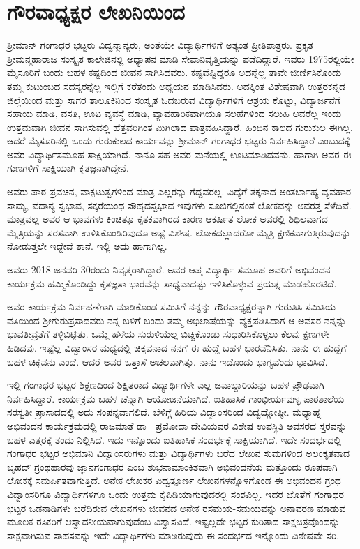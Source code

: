 \chapter{ಗೌರವಾಧ್ಯಕ್ಷರ ಲೇಖನಿಯಿಂದ}

ಶ್ರೀಮಾನ್ ಗಂಗಾಧರ ಭಟ್ಟರು ವಿದ್ವನ್ಮಾನ್ಯರು, ಅಂತೆಯೇ ವಿದ್ಯಾರ್ಥಿಗಳಿಗೆ ಅತ್ಯಂತ ಪ್ರೀತಿಪಾತ್ರರು. ಪ್ರಕೃತ ಶ್ರೀಮನ್ಮಹಾರಾಜ ಸಂಸ್ಕೃತ ಕಾಲೇಜಿನಲ್ಲಿ ಅಧ್ಯಾಪನ ಮಾಡಿ ಸೇವಾನಿವೃತ್ತಿಯನ್ನು ಪಡೆದಿದ್ದಾರೆ. ಇವರು 1975ರಲ್ಲಿಯೇ ಮೈಸೂರಿಗೆ ಬಂದು ಬಹಳ ಕಷ್ಟದಿಂದ ಜೀವನ ಸಾಗಿಸಿದವರು. ಕಷ್ಟವೆಷ್ಟಿದ್ದರೂ ಅದನ್ನೆಲ್ಲ ತಾವೇ ಜೀರ್ಣಿಸಿಕೊಂಡು ತಮ್ಮ ಕುಟುಂಬದ ಸದಸ್ಯರನ್ನೆಲ್ಲ ಇಲ್ಲಿಗೆ ಕರೆತಂದು ಅಧ್ಯಯನ ಮಾಡಿಸಿದರು. ಅದಕ್ಕಿಂತ ವಿಶೇಷವಾಗಿ ಉತ್ತರಕನ್ನಡ ಜಿಲ್ಲೆಯಿಂದ ಮತ್ತು ಸಾಗರ ತಾಲೂಕಿನಿಂದ ಸಂಸ್ಕೃತ ಓದಬರುವ ವಿದ್ಯಾರ್ಥಿಗಳಿಗೆ ಆಶ್ರಯ ಕೊಟ್ಟು, ವಿದ್ಯಾರ್ಜನೆಗೆ ಸಹಾಯ ಮಾಡಿ, ವಸತಿ, ಊಟ ವ್ಯವಸ್ಥೆ ಮಾಡಿ, ವ್ಯಾವಹಾರಿಕವಾಗಿಯೂ ಸಲಹೆಗಳಿಂದ ಸಲುಹಿ ಅವರೆಲ್ಲ ಇಂದು ಉತ್ತಮವಾಗಿ ಜೀವನ ಸಾಗಿಸುವಲ್ಲಿ ಹೆತ್ತವರಿಗಿಂತ ಮಿಗಿಲಾದ ಪಾತ್ರವಹಿಸಿದ್ದಾರೆ. ಹಿಂದಿನ ಕಾಲದ ಗುರುಕುಲ ಈಗಿಲ್ಲ. ಆದರೆ ಮೈಸೂರಿನಲ್ಲಿ ಒಂದು ಗುರುಕುಲದ ಕಾರ್ಯವನ್ನು ಶ್ರೀಮಾನ್ ಗಂಗಾಧರ ಭಟ್ಟರು ನಿರ್ವಹಿಸಿದ್ದಾರೆ ಎಂಬುದಕ್ಕೆ ಅವರ ವಿದ್ಯಾರ್ಥಿಸಮೂಹ ಸಾಕ್ಷಿಯಾಗಿದೆ. ನಾನೂ ಸಹ ಅವರ ಮನೆಯಲ್ಲಿ ಊಟಮಾಡಿದವನು. ಹಾಗಾಗಿ ಅವರ ಈ ಗುಣಗಳಿಗೆ ಸಾಕ್ಷಿಯಾಗಿ ಕೃತಜ್ಞನಾಗಿದ್ದೇನೆ.
	
ಅವರು ಪಾಠ-ಪ್ರವಚನ, ವಾಕ್ಪಟುತ್ವಗಳಿಂದ ಮಾತ್ರ ಎಲ್ಲರನ್ನು ಗೆದ್ದವರಲ್ಲ. ವಿದ್ಯೆಗೆ ತಕ್ಕನಾದ ಅಂತರ್ಬಾಹ್ಯ ವ್ಯವಹಾರ ಸಾಮ್ಯ, ವದಾನ್ಯ ಸ್ವಭಾವ, ಸಕ್ಕರೆಯಂಥ ಸೌಹೃದಸ್ವಭಾವ ಇವುಗಳು ಸೂಜಿಗಲ್ಲಿನಂತೆ ಲೋಕವನ್ನು ಅವರತ್ತ ಸೆಳೆದಿವೆ. ಮಾತ್ರವಲ್ಲ ಅವರ ಆ ಭಾವಗಳು ಕಿಂಚಿತ್ತೂ ಕೃತಕವಾಗಿರದ ಕಾರಣ ಆಕರ್ಷಿತ ಲೋಕ ಅವರಲ್ಲಿ ಶಿಥಿಲವಾಗದ ಮೈತ್ರಿಯನ್ನು ಸರಸವಾಗಿ ಉಳಿಸಿಕೊಂಡಿರಿವುದೂ ಅಷ್ಟೆ ವಿಶೇಷ. ಲೋಕದಲ್ಲಾದರೋ ಮೈತ್ರಿ ಕ್ಷಣಿಕವಾಗುತ್ತಿರುವುದನ್ನು ನೋಡುತ್ತಲೇ ಇದ್ದೇವೆ ತಾನೆ. ಇಲ್ಲಿ ಅದು ಹಾಗಾಗಿಲ್ಲ.
 
ಅವರು 2018 ಜನವರಿ 30ರಂದು ನಿವೃತ್ತರಾಗಿದ್ದಾರೆ. ಅವರ ಆಪ್ತ ವಿದ್ಯಾರ್ಥಿ ಸಮೂಹ ಅವರಿಗೆ ಅಭಿವಂದನ ಕಾರ್ಯಕ್ರಮ ಹಮ್ಮಿಕೊಂಡಿದ್ದು ಕೃತಜ್ಞತಾ ಭಾರವನ್ನು ಸಾಧ್ಯವಾದಷ್ಟು ಇಳಿಸಿಕೊಳ್ಳುವ ಪ್ರಯತ್ನ ಮಾಡಹೊರಟಿದೆ. 

ಅವರ ಕಾರ್ಯಕ್ರಮ ನಿರ್ವಹಣೆಗಾಗಿ ಮಾಡಿಕೊಂಡ ಸಮಿತಿಗೆ ನನ್ನನ್ನು ಗೌರವಾಧ್ಯಕ್ಷರನ್ನಾಗಿ ಗುರುತಿಸಿ ಸಮಿತಿಯ ವತಿಯಿಂದ ಶ್ರೀಗುರುಪ್ರಸಾದವರು ನನ್ನ ಬಳಿಗೆ ಬಂದು ತಮ್ಮ ಅಭಿಲಾಷೆಯನ್ನು ವ್ಯಕ್ತಪಡಿಸಿದಾಗ ಆ ಅವಸರ ನನ್ನನ್ನು ಭಾವತೀವ್ರತೆಗೆ ತಳ್ಳಿಬಿಟ್ಟಿತು. ಒಮ್ಮೆ ಹಳೆಯ ಸುರುಳಿಯೆಲ್ಲ ಬಿಚ್ಚಿಕೊಂಡು ಸುಧಾರಿಸಿಕೊಳ್ಳಲು ಕೆಲವು ಕ್ಷಣಗಳೇ ಹಿಡಿದವು. ಇಷ್ಟೆಲ್ಲ ವಿದ್ವಾಂಸರ ಮಧ್ಯದಲ್ಲಿ ಚಿಕ್ಕವನಾದ ನನಗೆ ಈ ಹುದ್ದೆ ಬಹಳ ಭಾರವೆನಿಸಿತು. ನಾನು ಈ ಹುದ್ದೆಗೆ ಬಹಳ ಚಿಕ್ಕವನು ಎಂದೆ. ಆದರೆ ಅವರ ಒತ್ತಾಸೆ ಅಚಲವಾಗಿತ್ತು. ನಾನು ಇದೊಂದು ಭಾಗ್ಯವೆಂದು ಭಾವಿಸಿದೆ.

ಇಲ್ಲಿ ಗಂಗಾಧರ ಭಟ್ಟರ ಶಿಕ್ಷಣದಿಂದ ಶಿಕ್ಷಿತರಾದ ವಿದ್ಯಾರ್ಥಿಗಳೇ ಎಲ್ಲ ಜವಾಬ್ದಾರಿಯನ್ನು ಬಹಳ ಪ್ರೌಢವಾಗಿ ನಿರ್ವಹಿಸಿದ್ದಾರೆ. ಕಾರ್ಯಕ್ರಮ ಬಹಳ ಚೆನ್ನಾಗಿ ಆಯೋಜನೆಯಾಗಿದೆ. ಐತಿಹಾಸಿಕ ಗಾಂಭೀರ್ಯವುಳ್ಳ ಪಾಠಶಾಲೆಯ ಸರಸ್ವತೀ ಪ್ರಾಸಾದದಲ್ಲಿ ಅದು ಸಂಪನ್ನವಾಗಲಿದೆ. ಬೆಳಿಗ್ಗೆ ಹಿರಿಯ ವಿದ್ವಾಂಸರಿಂದ ವಿದ್ವದ್ಗೋಷ್ಠೀ.  ಮಧ್ಯಾಹ್ನ ಅಭಿವಂದನ ಕಾರ್ಯಕ್ರಮದಲ್ಲಿ ರಾಜಮಾತೆ ಡಾ | ಪ್ರಮೋದಾ ದೇವಿಯವರ ವಿಶೇಷ ಉಪಸ್ಥಿತಿ ಅವಸರದ ಸ್ತರವನ್ನು ಬಹಳ ಎತ್ತರಕ್ಕೆ ತಂದು ನಿಲ್ಲಿಸಿದೆ. ಇದು ಇನ್ನೊಂದು ಐತಿಹಾಸಿಕ ಸಂದರ್ಭಕ್ಕೆ ಸಾಕ್ಷಿಯಾಗಿದೆ. ಇದೇ ಸಂದರ್ಭದಲ್ಲಿ ಗಂಗಾಧರ ಭಟ್ಟರ ಅಭಿಮಾನಿ ವಿದ್ವಾಂಸರುಗಳು ಮತ್ತು ವಿದ್ಯಾರ್ಥಿಗಳು ಬರೆದ ಲೇಖನ ಸುಮಗಳಿಂದ ಅಲಂಕೃತವಾದ ಬೃಹದ್ ಗ್ರಂಥಹಾರವು ಜ್ಞಾನಗಂಗಾಧರ ಎಂಬ ಶುಭನಾಮಾಂಕಿತವಾಗಿ ಅಭಿವಂದನೆಯ ಮತ್ತೊಂದು ರೂಪವಾಗಿ ಲೋಕಕ್ಕೆ ಸಮರ್ಪಿತವಾಗುತ್ತಿದೆ. ಅನೇಕ ಲೇಖಕರ ವಿದ್ವತ್ಪೂರ್ಣ ಲೇಖನಗಳನ್ನೊಳಗೊಂಡ ಈ ಅಭಿವಂದನ ಗ್ರಂಥ ವಿದ್ವಾಂಸರಿಗೂ ವಿದ್ಯಾರ್ಥಿಗಳಿಗೂ ಒಂದು ಉತ್ತಮ ಕೈಪಿಡಿಯಾಗುವುದರಲ್ಲಿ ಸಂಶವಿಲ್ಲ. ಇದರ ಜೊತೆಗೆ ಗಂಗಾಧರ ಭಟ್ಟರ ಒಡನಾಡಿಗಳು ಬರೆದಿರುವ ಲೇಖನಗಳು ಜೀವನದ ಅನೇಕ ರಸಮಯ-ಸಮಯವನ್ನು ಅನಾವರಣ ಮಾಡುವ ಮೂಲಕ ರಸಿಕರಿಗೆ ಆಸ್ವಾದನೀಯವಾಗುವುದೆಂಬ ವಿಶ್ವಾಸವಿದೆ. ಇಷ್ಟಲ್ಲದೇ ಭಟ್ಟರ ಕುರಿತಾದ ಸಾಕ್ಷಚಿತ್ರವೊಂದನ್ನು ಸಾಕ್ಷವಾಗಿಸುವ ಸಾಹಸವನ್ನು ಇದೇ ವಿದ್ಯಾರ್ಥಿಗಳು ಮಾಡಿರುವುದು ಈ ಸಂದರ್ಭದ ಇನ್ನೊಂದು ವಿಶೇಷವೇ ಸರಿ. 

